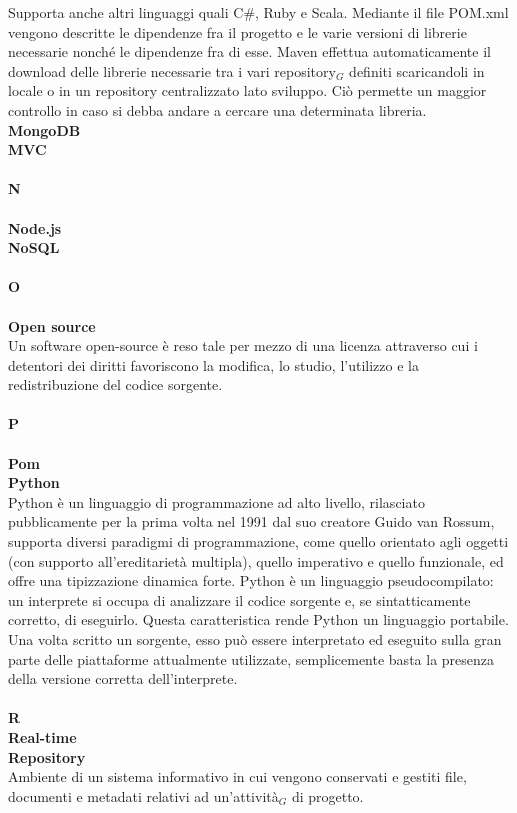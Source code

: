 Supporta anche altri linguaggi quali C\#, Ruby e Scala.
Mediante il file POM.xml vengono descritte le dipendenze fra il progetto e le varie versioni di librerie necessarie nonché le dipendenze fra di esse.
Maven effettua automaticamente il download delle librerie necessarie tra i vari repository$_G$ definiti scaricandoli in locale o in un repository centralizzato lato sviluppo.
Ciò permette un maggior controllo in caso si debba andare a cercare una determinata libreria.\\
\textbf{MongoDB}\\
\textbf{MVC}\\
\\
\textbf{N}\\
\\
\textbf{Node.js}\\
\textbf{NoSQL}\\
\\
\textbf{O}\\
\\
\textbf{Open source}\\
Un software open-source è reso tale per mezzo di una licenza attraverso cui i detentori dei diritti favoriscono la modifica, lo studio, l'utilizzo e la redistribuzione del codice sorgente.\\
\\
\textbf{P}\\
\\
\textbf{Pom}\\
\textbf{Python}\\
Python è un linguaggio di programmazione ad alto livello, rilasciato pubblicamente per la prima volta nel 1991 dal suo creatore Guido van Rossum, supporta diversi paradigmi di programmazione, come quello orientato agli oggetti (con supporto all'ereditarietà multipla), quello imperativo e quello funzionale, ed offre una tipizzazione dinamica forte.
Python è un linguaggio pseudocompilato: un interprete si occupa di analizzare il codice sorgente e, se sintatticamente corretto, di eseguirlo. Questa caratteristica rende Python un linguaggio portabile. Una volta scritto un sorgente, esso può essere interpretato ed eseguito sulla gran parte delle piattaforme attualmente utilizzate, semplicemente basta la presenza della versione corretta dell’interprete.\\
\\
\textbf{R}
\\
\textbf{Real-time}\\
\textbf{Repository}\\
Ambiente di un sistema informativo in cui vengono conservati e gestiti file, documenti e metadati relativi ad un’attività$_G$ di progetto.\\
